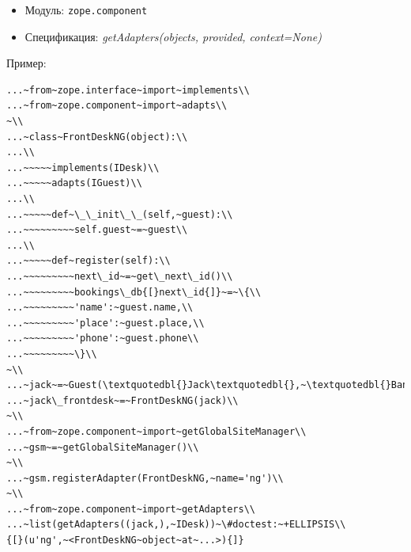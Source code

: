 \documentclass[a4paper,openany,twoside,draft]{book}
\providecommand*{\DUroletitlereference}[1]{\textsl{#1}}
\begin{document}
\begin{itemize}

\item Модуль: \texttt{zope.component}

\item Спецификация: \DUroletitlereference{getAdapters(objects, provided, context=None)}

\end{itemize}

Пример:

\begin{verbatim}
...~from~zope.interface~import~implements\\
...~from~zope.component~import~adapts\\
~\\
...~class~FrontDeskNG(object):\\
...\\
...~~~~~implements(IDesk)\\
...~~~~~adapts(IGuest)\\
...\\
...~~~~~def~\_\_init\_\_(self,~guest):\\
...~~~~~~~~~self.guest~=~guest\\
...\\
...~~~~~def~register(self):\\
...~~~~~~~~~next\_id~=~get\_next\_id()\\
...~~~~~~~~~bookings\_db{[}next\_id{]}~=~\{\\
...~~~~~~~~~'name':~guest.name,\\
...~~~~~~~~~'place':~guest.place,\\
...~~~~~~~~~'phone':~guest.phone\\
...~~~~~~~~~\}\\
~\\
...~jack~=~Guest(\textquotedbl{}Jack\textquotedbl{},~\textquotedbl{}Bangalore\textquotedbl{})\\
...~jack\_frontdesk~=~FrontDeskNG(jack)\\
~\\
...~from~zope.component~import~getGlobalSiteManager\\
...~gsm~=~getGlobalSiteManager()\\
~\\
...~gsm.registerAdapter(FrontDeskNG,~name='ng')\\
~\\
...~from~zope.component~import~getAdapters\\
...~list(getAdapters((jack,),~IDesk))~\#doctest:~+ELLIPSIS\\
{[}(u'ng',~<FrontDeskNG~object~at~...>){]}
\end{verbatim}
\end{document}
